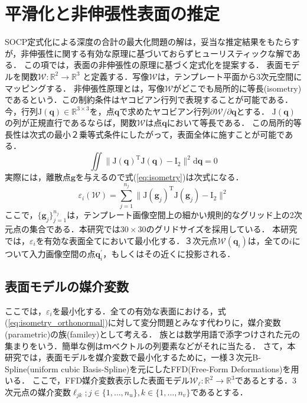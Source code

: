 \documentclass[10.5pt,twocolumn,a4j,fleqn]{ujarticle}
\def\eqref#1{式(\ref{#1})}
\begin{document}
\section{平滑化と非伸張性表面の推定}\label{sec:FFDref}
SOCP定式化による深度の合計の最大化問題の解は，妥当な推定結果をもたらすが，非伸張性に関する有効な原理に基づいておらずヒューリスティックな解である．
この項では，表面の非伸張性の原理に基づく定式化を提案する．
表面モデルを関数$ \mathcal{W}: \mathbb{R}^2 \to \mathbb{R}^3$ と定義する．写像$\mathcal{W}$は，テンプレート平面から3次元空間にマッピングする．
非伸張性原理とは，写像$\mathcal{W}$がどこでも局所的に等長(isometry)であるという．この制約条件はヤコビアン行列で表現することが可能である．
今，行列$\mathrm{J}(\mathrm{\bm{q}}) \in \mathbb{R}^{3 \times 3}$を，点$\mathrm{\bm{q}}$で求めたヤコビアン行列$\partial \mathcal{W} / \partial \mathrm{\bm{q}}$とする．
$\mathrm{J}(\mathrm{\bm{q}})$の列が正規直行であるならば，関数$\mathcal{W}$は点$\mathrm{\bm{q}}$において等長である．
この局所的等長性は次式の最小２乗等式条件にしたがって，表面全体に施すことが可能である．
\begin{equation}
    \iint \|\mathrm{J}(\mathrm{\bm{q}})^{\mathrm{T}}\mathrm{J}(\mathrm{\bm{q}}) - \mathrm{I}_2 \|^2 \mathrm{d\bm{q}} = 0
    \label{eq:isometry}
\end{equation}
実際には，離散点$\bm{g}$を与えるので\eqref{eq:isometry}は次式になる．
\begin{equation}
    \varepsilon_i(\mathcal{W})=\sum_{j=1}^{n_j}\|\mathrm{J}(\bm{g}_j)^{\mathrm{T}}\mathrm{J}(\bm{g}_j) - \mathrm{I}_2 \|^2
    \label{eq:isometry_orthonormal}
\end{equation}
ここで，$\{\bm{g}_j\}_{j=1}^{n_j}$は，テンプレート画像空間上の細かい規則的なグリッド上の2次元点の集合である．本研究では$30\times30$のグリドサイズを採用している．
本研究では，$\varepsilon_i$を有効な表面全てにおいて最小化する．３次元点$\mathcal{W}(\mathrm{\bm{q}}_i)$は，全ての$i$について入力画像空間の点$\mathrm{\bm{q}}_i^{\prime}$，もしくはその近くに投影される．

\subsection{表面モデルの媒介変数}
ここでは，$\varepsilon_i$を最小化する．全ての有効な表面における，\eqref{eq:isometry_orthonormal}に対して変分問題とみなす代わりに，媒介変数(parametric)の族(familey)として考える．
族とは数学用語で添字つけされた元の集まりをいう．簡単な例はｍベクトルの列要素などがそれに当たる．
さて，本研究では，表面モデルを媒介変数で最小化するために，一様３次元B-Spline(uniform cubic Basis-Spline)を元にしたFFD(Free-Form Deformations)\cite{Rueckert1999}を用いる．
ここで，FFD媒介変数表示した表面モデル$\mathcal{W}_{\bm{\ell}}: \mathbb{R}^2 \to \mathbb{R}^3$であるとする．3次元点の媒介変数$\bm{\ell}_{jk}; j \in \{1, \dots, n_u\}, k \in \{1, \dots, n_v\}$であるとする．
\end{document}
